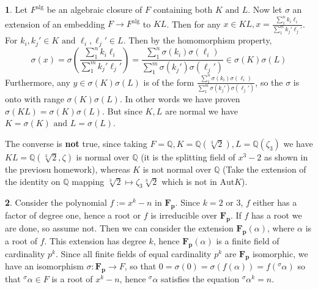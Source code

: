 \documentclass[11pt]{article}
\theoremstyle{definition}
\newtheorem{pb}{}
\newcommand{\tand}{\text{ and }}
\newcommand{\tor}{\text{ or }}
\newcommand{\falg}{F^{\text{alg}}}
\begin{document}
    \begin{pb}
        Let \(\falg\) be an algebraic closure of \(F\) containing both \(K \tand L\). Now let \(\sigma\) an extension of an embedding \(F \to \falg\) to
        \(KL\). Then for any \(x \in KL, x = \frac{\sum_1^n k_i\ell_i}{\sum_1^m k_j' \ell_j'}\). For \(k_i,k_j' \in K \tand \ell_i,\ell_j' \in L\). Then by the homomorphism property,
        \[\sigma(x) = \sigma(\frac{\sum_1^n k_i\ell_i}{\sum_1^m k_j' \ell_j'}) = \frac{\sum_1^n \sigma(k_i)\sigma(\ell_i)}{\sum_1^m \sigma(k_j')\sigma(\ell_j')} \in \sigma(K)\sigma(L)\]
        Furthermore, any \(y \in \sigma(K)\sigma(L)\) is of the form \(\frac{\sum_1^n \sigma(k_i)\sigma(\ell_i)}{\sum_1^m \sigma(k_j')\sigma(\ell_j')}\), so the \(\sigma\) is onto with range \(\sigma(K)\sigma(L)\).
        In other words we have proven \(\sigma(KL) = \sigma(K)\sigma(L)\). But since \(K,L\) are normal we have \(K = \sigma(K) \tand L = \sigma(L)\).

        The converse is \textbf{not} true, since taking \(F = \mathbb{Q}, K = \mathbb{Q}(\sqrt[3]{2}), L = \mathbb{Q}(\zeta_3)\) we have
        \(KL = \mathbb{Q}(\sqrt[3]{2}, \zeta)\) is normal over \(\mathbb{Q}\) (it is the splitting field of \(x^3 -2\) as shown in the previosu homework),
         whereas \(K\) is not normal over \(\mathbb{Q}\) (Take the extension of the identity on 
        \(\mathbb{Q}\) mapping \(\sqrt[3]{2} \mapsto \zeta_3\sqrt[3]{2}\) which is not in \(\text{Aut} K\)).
    \end{pb}
    \begin{pb}
        Consider the polynomial \(f:= x^k - n\) in \(\mathbf{F_p}\). Since \(k = 2 \tor 3\), \(f\) either has a factor of degree one, hence a root or \(f\) is irreducible over \(\mathbf{F_p}\).
        If \(f\) has a root we are done, so assume not. Then we can consider the extension \(\mathbf{F_p}(\alpha)\), where \(\alpha\) is a root of \(f\). This extension has degree \(k\), hence
        \(\mathbf{F_p}(\alpha)\) is a finite field of cardinality \(p^k\). Since all finite fields of equal cardinality \(p^k\) are \(\mathbf{F_p}\) isomorphic, we have an isomorphism
        \(\sigma: \mathbf{F_p} \to F\), so that \(0 = \sigma(0) = \sigma(f(\alpha)) = f({}^\sigma\alpha)\) so that \(^\sigma \alpha \in F\) is a root of \(x^k - n\), hence 
        \(^\sigma \alpha\) satisfies the equation \({}^\sigma \alpha^k = n\).
    \end{pb}
\end{document}
